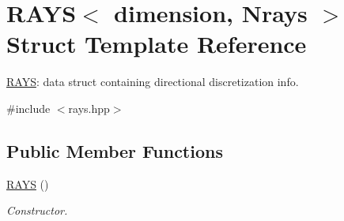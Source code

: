 \hypertarget{structRAYS}{}\section{R\+A\+YS$<$ dimension, Nrays $>$ Struct Template Reference}
\label{structRAYS}


\mbox{\hyperlink{structRAYS}{R\+A\+YS}}\+: data struct containing directional discretization info.  




{\ttfamily \#include $<$rays.\+hpp$>$}

\subsection*{Public Member Functions}
\begin{DoxyCompactItemize}
\item 
\mbox{\label{structRAYS_a45fc0b991b631af8f470f838e15c15d7}} 
\mbox{\hyperlink{structRAYS_a45fc0b991b631af8f470f838e15c15d7}{R\+A\+YS}} ()
\begin{DoxyCompactList}\small\item\em Constructor. \end{DoxyCompactList}\end{DoxyCompactItemize}

